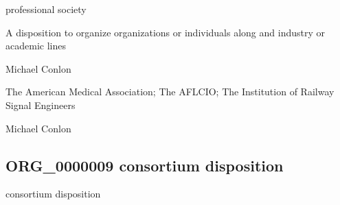 \documentclass[letterpaper,10pt,english]{sphinxmanual}
\begin{document}
\begin{sphinxShadowBox}

\sphinxAtStartPar
professional society
\end{sphinxShadowBox}

\begin{sphinxShadowBox}

\sphinxAtStartPar
{\hyperref[\detokenize{doc-BFO_0000016::doc}]{}}
\end{sphinxShadowBox}

\begin{sphinxShadowBox}

\sphinxAtStartPar
A disposition to organize organizations or individuals along and industry or academic lines
\end{sphinxShadowBox}

\begin{sphinxShadowBox}

\sphinxAtStartPar
Michael Conlon 
\end{sphinxShadowBox}

\begin{sphinxShadowBox}

\sphinxAtStartPar
The American Medical Association; The AFL\sphinxhyphen{}CIO; The Institution of Railway Signal Engineers
\end{sphinxShadowBox}

\begin{sphinxShadowBox}

\sphinxAtStartPar
Michael Conlon 
\end{sphinxShadowBox}
\begin{quote}

\ignorespaces \end{quote}


\subsection{ORG\_0000009 \sphinxhyphen{} consortium disposition}
\label{\detokenize{doc-ORG_0000009:org-0000009-consortium-disposition}}\label{\detokenize{doc-ORG_0000009:index-0}}\label{\detokenize{doc-ORG_0000009::doc}}
\begin{sphinxShadowBox}

\sphinxAtStartPar
consortium disposition
\end{sphinxShadowBox}
\end{document}
